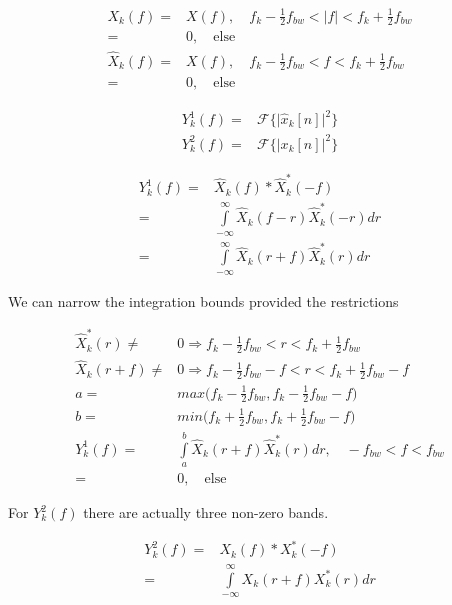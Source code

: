 \documentclass [11pt, proquest] {uwthesis}[2015/03/03]
\begin{document}
\begin{align}
X_{k}(f) =& X(f), \quad f_k - \frac{1}{2} f_{bw} < |f| < f_k + \frac{1}{2} f_{bw} \\
=& 0, \quad \mathrm{else} \\
\widehat{X}_{k}(f) =& X(f), \quad f_k - \frac{1}{2} f_{bw} < f < f_k + \frac{1}{2} f_{bw} \\
=& 0, \quad \mathrm{else}
\end{align}

\begin{align}
Y_{k}^1(f) =& \mathcal{F}\Big\{ \Big| \widehat{x}_k[n] \Big|^2  \Big\} \\
Y_{k}^2(f) =& \mathcal{F}\Big\{ \Big| x_k[n] \Big|^2  \Big\}
\end{align}

\begin{align}
Y_{k}^1(f) =& \widehat{X}_{k}(f) * \widehat{X}_{k}^*(-f) \\
=& \int\limits_{-\infty}^{\infty} \widehat{X}_{k}(f - r) \widehat{X}_{k}^*(-r)dr \\
=& \int\limits_{-\infty}^{\infty} \widehat{X}_{k}(r + f) \widehat{X}_{k}^*(r)dr
\end{align}

We can narrow the integration bounds provided the restrictions

\begin{align}
\widehat{X}_{k}^*(r) \neq& 0 \Rightarrow  f_k - \frac{1}{2} f_{bw} < r < f_k + \frac{1}{2} f_{bw} \\
\widehat{X}_{k}(r + f) \neq& 0 \Rightarrow  f_k - \frac{1}{2} f_{bw} - f < r < f_k + \frac{1}{2} f_{bw} - f \\
a =& max\Big( f_k - \frac{1}{2} f_{bw},  f_k - \frac{1}{2} f_{bw} - f\Big) \\
b =& min\Big( f_k + \frac{1}{2} f_{bw},  f_k + \frac{1}{2} f_{bw} - f\Big) \\
Y_{k}^1(f) =& \int\limits_{a}^{b} \widehat{X}_{k}(r + f) \widehat{X}_{k}^*(r)dr, \quad -f_{bw} < f < f_{bw} \\
=& 0, \quad \mathrm{else}
\end{align}

For $Y_k^2(f)$ there are actually three non-zero bands.

\begin{align}
Y_{k}^2(f) =& X_{k}(f) * X_{k}^*(-f) \\
=& \int\limits_{-\infty}^{\infty} X_{k}(r + f) X_{k}^*(r)dr
\end{align}
\end{document}
